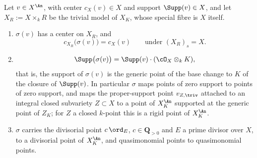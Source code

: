 \begin{theorem}
\label{thm:ch30-gauss-centers-supports}
Let $v\in X^{\An}$, with center $c_X(v)\in X$ and support
$\Supp(v)\in X$, and let $X_R:=X\times_kR$ be the trivial model of
$X_K$, whose special fibre is $X$ itself.
\begin{enumerate}
\item\label{itm:ch30-gcs:center}
$\sigma(v)$ has a center on $X_R$, and
\begin{equation}
\label{eq:ch30-gauss-center}
 c_{X_R}\bigl(\sigma(v)\bigr)=c_X(v)
 \qquad\text{under }(X_R)_s=X .
\end{equation}
\item\label{itm:ch30-gcs:support}
\begin{equation}
\label{eq:ch30-gauss-support}
 \Supp\bigl(\sigma(v)\bigr)=\Supp(v)\cdot(\cO_X\otimes_kK),
\end{equation}
that is, the support of $\sigma(v)$ is the generic point of the base
change to $K$ of the closure of $\Supp(v)$.  In particular $\sigma$
maps points of zero support to points of zero support, and maps the
proper-support point $v_{Z,\triv}$ attached to an integral closed
subvariety $Z\subset X$ to a point of $X_K^{\An}$ supported at the
generic point of $Z_K$; for $Z$ a closed $k$-point this is a rigid
point of $X_K^{\An}$.
\item\label{itm:ch30-gcs:divisorial}
$\sigma$ carries the divisorial point $c\,\ord_E$, $c\in\mathbf
Q_{>0}$ and $E$ a prime divisor over $X$, to a divisorial point of
$X_K^{\An}$, and quasimonomial points to quasimonomial points.
\end{enumerate}
\end{theorem}

